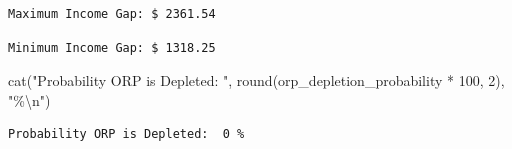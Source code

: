 \documentclass[
  letterpaper,
  DIV=11,
  numbers=noendperiod]{scrartcl}
\newenvironment{Shaded}{\begin{snugshade}}{\end{snugshade}}
\newcommand{\DecValTok}[1]{\textcolor[rgb]{0.68,0.00,0.00}{#1}}
\newcommand{\FunctionTok}[1]{\textcolor[rgb]{0.28,0.35,0.67}{#1}}
\newcommand{\NormalTok}[1]{\textcolor[rgb]{0.00,0.23,0.31}{#1}}
\newcommand{\SpecialCharTok}[1]{\textcolor[rgb]{0.37,0.37,0.37}{#1}}
\newcommand{\StringTok}[1]{\textcolor[rgb]{0.13,0.47,0.30}{#1}}
\begin{document}
\begin{verbatim}
Maximum Income Gap: $ 2361.54 
\end{verbatim}

\begin{Shaded}
\end{Shaded}

\begin{verbatim}
Minimum Income Gap: $ 1318.25 
\end{verbatim}

\begin{Shaded}
\begin{Highlighting}[]
\FunctionTok{cat}\NormalTok{(}\StringTok{"Probability ORP is Depleted: "}\NormalTok{, }\FunctionTok{round}\NormalTok{(orp\_depletion\_probability }\SpecialCharTok{*} \DecValTok{100}\NormalTok{, }\DecValTok{2}\NormalTok{), }\StringTok{"\%}\SpecialCharTok{\textbackslash{}n}\StringTok{"}\NormalTok{)}
\end{Highlighting}
\end{Shaded}

\begin{verbatim}
Probability ORP is Depleted:  0 %
\end{verbatim}
\end{document}
